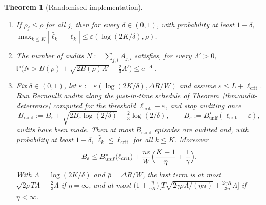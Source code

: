 \documentclass[11pt,a4paper]{article}
\newtheorem{theorem}{Theorem}
\newcommand{\Prob}{\mathbb{P}}
\begin{document}
\begin{theorem}[Randomised implementation]\label{thm:audit-random}
\begin{enumerate}
\item[\textup{(a)}] If $\rho_j\le\bar\rho$ for all $j$, then for every
$\delta\in(0,1)$, with probability at least $1-\delta$,
$\max_{k\le K}|\hat\ell_k-\ell_k|\le\varepsilon(\log(2K/\delta),\bar\rho)$.
\item[\textup{(b)}] The number of audits $N:=\sum_{j,i}A_{j,i}$ satisfies, for
every $\Lambda'>0$,
$\Prob\bigl(N>B(\rho)+\sqrt{2B(\rho)\Lambda'}+\tfrac23\Lambda'\bigr)\le e^{-\Lambda'}$.
\item[\textup{(c)}] Fix $\delta\in(0,1)$, let
$\varepsilon:=\varepsilon(\log(2K/\delta),\Delta R/W)$ and assume
$\varepsilon\le L+\ell_{\mathrm{crit}}$. Run Bernoulli audits along the
just-in-time schedule of Theorem~\ref{thm:audit-deterrence} computed for the
threshold $\ell_{\mathrm{crit}}-\varepsilon$, and stop auditing once
\[
  B_{\mathrm{rand}}:=B_\varepsilon+\sqrt{2B_\varepsilon\log(2/\delta)}+\tfrac23\log(2/\delta),
  \qquad B_\varepsilon:=B^\star_{\mathrm{unif}}(\ell_{\mathrm{crit}}-\varepsilon),
\]
audits have been made. Then at most $B_{\mathrm{rand}}$ episodes are audited
and, with probability at least $1-\delta$,
$\hat\ell_k\le\ell_{\mathrm{crit}}$ for all $k\le K$. Moreover
\begin{equation}\label{eq:audit-inflation}
  B_\varepsilon\le B^\star_{\mathrm{unif}}(\ell_{\mathrm{crit}})
  +\frac{n\varepsilon}{W}\Bigl(\frac{K-1}{\eta}+\frac1\gamma\Bigr).
\end{equation}
With $\Lambda=\log(2K/\delta)$ and $\bar\rho=\Delta R/W$, the last term is at
most $\sqrt{2\bar\rho\,T\Lambda}+\tfrac23\Lambda$ if $\eta=\infty$, and at most
$\bigl(1+\tfrac{\eta}{\gamma K}\bigr)\bigl[T\sqrt{2\gamma\bar\rho\Lambda/(\eta n)}
+\tfrac{2\gamma K}{3\eta}\Lambda\bigr]$ if $\eta<\infty$.
\end{enumerate}
\end{theorem}
\end{document}
